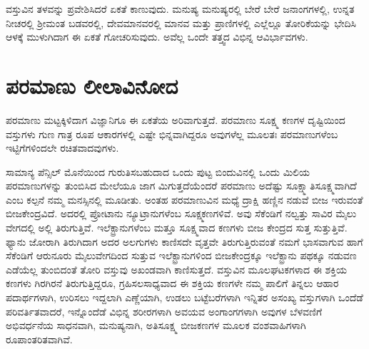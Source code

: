 ವಸ್ತುವಿನ ತಳವನ್ನು ಪ್ರವೇಶಿಸಿದರೆ ಏಕತೆ ಕಾಣುವುದು. ಮನುಷ್ಯ ಮನುಷ್ಯರಲ್ಲಿ ಬೇರೆ ಬೇರೆ ಜನಾಂಗಗಳಲ್ಲಿ, ಉನ್ನತ ನೀಚರಲ್ಲಿ ಶ‍್ರೀಮಂತ ಬಡವರಲ್ಲಿ, ದೇವಮಾನವರಲ್ಲಿ ಮಾನವ ಮತ್ತು ಪ್ರಾಣಿಗಳಲ್ಲಿ ಎಲ್ಲೆಲ್ಲೂ ತೋರಿಕೆಯನ್ನು ಭೇದಿಸಿ ಆಳಕ್ಕೆ ಮುಳುಗಿದಾಗ ಈ ಏಕತೆ ಗೋಚರಿಸುವುದು. ಅವೆಲ್ಲ ಒಂದೇ ತತ್ತ್ವದ ವಿಭಿನ್ನ ಆವಿರ್ಭಾವಗಳು.


\section*{ಪರಮಾಣು ಲೀಲಾವಿನೋದ}


ಪರಮಾಣು ಮಟ್ಟಕ್ಕಿಳಿದಾಗ ವಿಜ್ಞಾನಿಗೂ ಈ ಏಕತೆಯ ಅರಿವಾಗುತ್ತದೆ. ಪರಮಾಣು ಸೂಕ್ಷ್ಮ ಕಣಗಳ ದೃಷ್ಟಿಯಿಂದ ವಸ್ತುಗಳು ಗುಣ ಗಾತ್ರ ರೂಪ ಆಕಾರಗಳಲ್ಲಿ ಎಷ್ಟೇ ಭಿನ್ನವಾಗಿದ್ದರೂ ಅವುಗಳೆಲ್ಲ ಮೂಲತಃ ಪರಮಾಣುಗಳೆಂಬ ಇಟ್ಟಿಗೆಗಳಿಂದಲೇ ರಚಿತವಾದವುಗಳು.

ಸಾಮಾನ್ಯ ಪೆನ್ಸಿಲ್ ಮೊನೆಯಿಂದ ಗುರುತಿಸಬಹುದಾದ ಒಂದು ಪುಟ್ಟ ಬಿಂದುವಿನಲ್ಲಿ ಒಂದು ಮಿಲಿಯ ಪರಮಾಣುಗಳನ್ನು ತುಂಬಿಸಿದ ಮೇಲೆಯೂ ಜಾಗ ಮಿಗುತ್ತದೆಯೆಂದರೆ ಪರಮಾಣು ಅದೆಷ್ಟು ಸೂಕ್ಷ್ಮಾತಿಸೂಕ್ಷ್ಮವಾಗಿದೆ ಎಂಬ ಕಲ್ಪನೆ ನಮ್ಮ ಮನಸ್ಸಿನಲ್ಲಿ ಮೂಡೀತು. ಅಂತಹ ಪರಮಾಣುವಿನ ಮಧ್ಯೆ ದ್ರಾಕ್ಷಿ ಹಣ್ಣಿನ ನಡುವೆ ಬೀಜ ಇರುವಂತೆ ಬೀಜಕೇಂದ್ರವಿದೆ. ಅದರಲ್ಲಿ ಪ್ರೋಟಾನು ನ್ಯೂಟ್ರಾನುಗಳೆಂಬ ಸೂಕ್ಷ್ಮಕಣಗಳಿವೆ. ಅವು ಸೆಕೆಂಡಿಗೆ ನಲ್ವತ್ತು ಸಾವಿರ ಮೈಲು ವೇಗದಲ್ಲಿ ಅಲ್ಲಿ ತಿರುಗುತ್ತಿವೆ. ಇಲೆಕ್ಟ್ರಾನುಗಳೆಂಬ ಮತ್ತೂ ಸೂಕ್ಷ್ಮವಾದ ಕಣಗಳು ಬೀಜ ಕೇಂದ್ರದ ಸುತ್ತ ಸುತ್ತುತ್ತಿವೆ. ಫ್ಯಾನು ಜೋರಾಗಿ ತಿರುಗಿದಾಗ ಅದರ ಅಲಗುಗಳು ಕಾಣಿಸದೇ ವೃತ್ತವೇ ತಿರುಗುತ್ತಿರುವಂತೆ ನಮಗೆ ಭಾಸವಾಗುವ ಹಾಗೆ ಸೆಕೆಂಡಿಗೆ ಆರುನೂರು ಮೈಲುವೇಗದಿಂದ ಸುತ್ತುವ ಇಲೆಕ್ಟ್ರಾನುಗಳಿಂದ ಬೀಜಕೇಂದ್ರಕ್ಕೂ ಇಲೆಕ್ಟ್ರಾನು ಪಥಕ್ಕೂ ನಡುವಣ ಎಡೆಯೆಲ್ಲ ತುಂಬಿದಂತೆ ತೋರಿ ವಸ್ತುವು ಅಖಂಡವಾಗಿ ಕಾಣಿಸುತ್ತದೆ. ವಸ್ತುವಿನ ಮೂಲಘಟಕಗಳಾದ ಈ ಶಕ್ತಿಯ ಕಣಗಳು ಗಿರಗಿರನೆ ತಿರುಗುತ್ತಿದ್ದರೂ, ಗ್ರಹಿಸಲಸಾಧ್ಯವಾದ ಈ ಶಕ್ತಿಯ ಕಣಗಳೇ ನಮ್ಮ ಪಾಲಿಗೆ ತಿನ್ನಲು ಆಹಾರ ಪದಾರ್ಥಗಳಾಗಿ, ಉರಿಸಲು ಇದ್ದಲಾಗಿ ಎಣ್ಣೆಯಾಗಿ, ಉಡಲು ಬಟ್ಟೆಬರೆಗಳಾಗಿ ಇನ್ನಿತರ ಅಸಂಖ್ಯ ವಸ್ತುಗಳಾಗಿ ಒಂದೆಡೆ ಪರಿವರ್ತಿತವಾದರೆ, ಇನ್ನೊಂದೆಡೆ ವಿಭಿನ್ನ ಶರೀರಗಳಾಗಿ ಅವಯವ ಅಂಗಾಂಗಗಳಾಗಿ ಅವುಗಳ ಬೆಳವಣಿಗೆ ಅಭಿವರ್ಧನೆಯ ಸಾಧನವಾಗಿ, ಮನುಷ್ಯನಾಗಿ, ಅತಿಸೂಕ್ಷ್ಮ ಬೀಜಕಣಗಳ ಮೂಲಕ ವಂಶವಾಹಿಗಳಾಗಿ ರೂಪಾಂತರಿತವಾಗಿವೆ.

